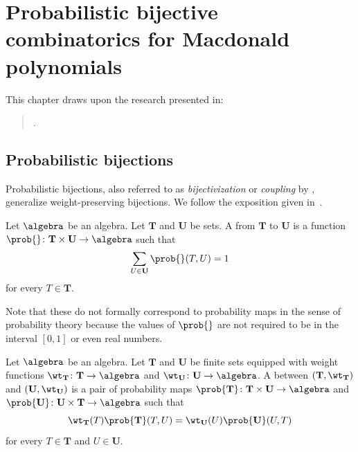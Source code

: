 \chapter{Probabilistic bijective combinatorics for Macdonald polynomials}

This chapter draws upon the research presented in:
\begin{quote}
    .
\end{quote}

\section{Probabilistic bijections}

Probabilistic bijections,
also referred to as \emph{bijectivization} or \emph{coupling} by \cite{BP19},
generalize weight-preserving bijections.
We follow the exposition given in~\cite{AF22}.

\begin{definition}
	Let \(\algebra\) be an algebra.
	Let \(\mathbf{T}\) and \(\mathbf{U}\) be sets.
	A  from \(\mathbf{T}\) to \(\mathbf{U}\) is
	a function \(\prob{} \colon \mathbf{T} \times \mathbf{U} \to \algebra\) such that
	\begin{equation*}
		\sum_{U \in\mathbf{U}} \prob{}(T, U) = 1
	\end{equation*}
	for every \(T \in \mathbf{T}\).
\end{definition}

Note that these do not formally correspond to probability maps
in the sense of probability theory
because the values of \(\prob{}\)
are not required to be in the interval \([0, 1]\) or even real numbers.

\begin{definition}\label{def:prob}
	Let \(\algebra\) be an algebra.
	Let \(\mathbf{T}\) and \(\mathbf{U}\) be finite sets
	equipped with weight functions
	\(\wt_{\mathbf{T}} \colon \mathbf{T} \to \algebra\) and
	\(\wt_{\mathbf{U}} \colon \mathbf{U} \to \algebra\).
	A  between
	\( (\mathbf{T}, \wt_{\mathbf{T}}) \) and
	\( (\mathbf{U}, \wt_{\mathbf{U}}) \) is
	a pair of probability maps
	\(\prob{\mathbf{T}} \colon \mathbf{T} \times \mathbf{U} \to \algebra\) and
	\(\prob{\mathbf{U}} \colon \mathbf{U} \times \mathbf{T} \to \algebra\)
	such that
	\begin{equation*}
		\wt_{\mathbf{T}}(T) \prob{\mathbf{T}}(T, U)
		= \wt_{\mathbf{U}}(U) \prob{\mathbf{U}}(U, T)
	\end{equation*}
	for every \(T \in \mathbf{T}\) and \(U \in \mathbf{U}\).
\end{definition}


